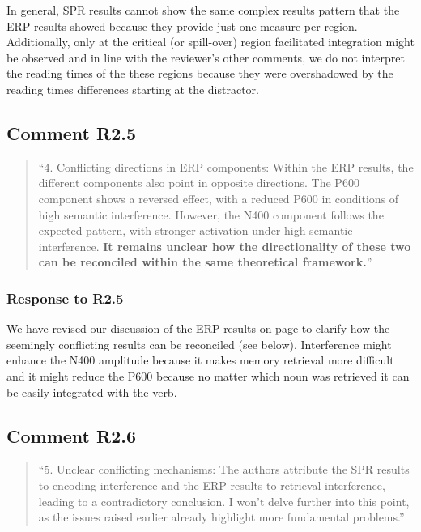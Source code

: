 \documentclass[12pt]{article}
\begin{document}
In general, SPR results cannot show the same complex results pattern that the ERP results showed because they provide just one measure per region. Additionally, only at the critical (or spill-over) region facilitated integration might be observed and in line with the reviewer's other comments, we do not interpret the reading times of the these regions because they were overshadowed by the reading times differences starting at the distractor.

 
\subsection*{Comment R2.5}
\begin{quote}
``4. Conflicting directions in ERP components: Within the ERP results, the different components also point in opposite directions. The P600 component shows a reversed effect, with a reduced P600 in conditions of high semantic interference. However, the N400 component follows the expected pattern, with stronger activation under high semantic interference. \textbf{It remains unclear how the directionality of these two can be reconciled within the same theoretical framework.}''
\end{quote}

\subsubsection*{Response to R2.5}
 
We have revised our discussion of the ERP results on page \pageref{inhibition_facilitation} to clarify how the seemingly conflicting results can be reconciled (see below). Interference might enhance the N400 amplitude because it makes memory retrieval more difficult and it might reduce the P600 because no matter which noun was retrieved it can be easily integrated with the verb.

\begin{quote}
\end{quote}
 
\subsection*{Comment R2.6}
\begin{quote}
``5. Unclear conflicting mechanisms: The authors attribute the SPR results to encoding interference and the ERP results to retrieval interference, leading to a contradictory conclusion. I won't delve further into this point, as the issues raised earlier already highlight more fundamental problems.''
\end{quote}
\end{document}
